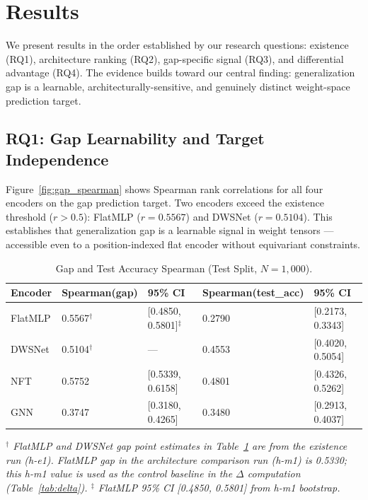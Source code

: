 \section{Results}
\label{sec:results}

We present results in the order established by our research questions: existence (RQ1), architecture
ranking (RQ2), gap-specific signal (RQ3), and differential advantage (RQ4). The evidence builds toward
our central finding: generalization gap is a learnable, architecturally-sensitive, and genuinely distinct
weight-space prediction target.

\subsection{RQ1: Gap Learnability and Target Independence}

Figure~\ref{fig:gap_spearman} shows Spearman rank correlations for all four encoders on the gap prediction
target. Two encoders exceed the existence threshold ($r > 0.5$): FlatMLP ($r = 0.5567$) and DWSNet
($r = 0.5104$). This establishes that generalization gap is a learnable signal in weight tensors --- accessible
even to a position-indexed flat encoder without equivariant constraints.

\begin{table}[h]
\centering
\caption{Gap and Test Accuracy Spearman (Test Split, $N=1{,}000$).}
\label{tab:results}
\begin{tabular}{@{}lllll@{}}
\toprule
Encoder & Spearman(gap) & 95\% CI & Spearman(test\_acc) & 95\% CI \\
\midrule
FlatMLP & 0.5567$^\dagger$ & [0.4850, 0.5801]$^\ddagger$ & 0.2790 & [0.2173, 0.3343] \\
DWSNet  & 0.5104$^\dagger$ & --- & 0.4553 & [0.4020, 0.5054] \\
NFT     & 0.5752 & [0.5339, 0.6158] & 0.4801 & [0.4326, 0.5262] \\
GNN     & 0.3747 & [0.3180, 0.4265] & 0.3480 & [0.2913, 0.4037] \\
\bottomrule
\end{tabular}
\end{table}

\noindent\textit{$^\dagger$ FlatMLP and DWSNet gap point estimates in Table~\ref{tab:results} are from the existence run (h-e1). FlatMLP gap in the architecture comparison run (h-m1) is 0.5330; this h-m1 value is used as the control baseline in the $\Delta$ computation (Table~\ref{tab:delta}). $^\ddagger$ FlatMLP 95\% CI [0.4850, 0.5801] from h-m1 bootstrap.}


